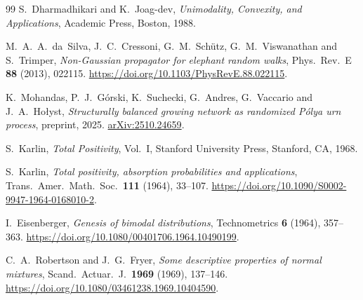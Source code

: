 \begin{thebibliography}{99}
S.~Dharmadhikari and K.~Joag-dev, \emph{Unimodality, Convexity, and
Applications}, Academic Press, Boston, 1988.

M.~A.~A.~da~Silva, J.~C.~Cressoni, G.~M.~Sch\"utz, G.~M.~Viswanathan and
S.~Trimper, \emph{Non-Gaussian propagator for elephant random walks},
Phys.\ Rev.\ E \textbf{88} (2013), 022115.
\url{https://doi.org/10.1103/PhysRevE.88.022115}.

K.~Mohandas, P.~J.~G\'orski, K.~Suchecki, G.~Andres, G.~Vaccario and J.~A.~Ho{\l}yst,
\emph{Structurally balanced growing network as randomized P\'olya urn process},
preprint, 2025.
\href{https://arxiv.org/abs/2510.24659}{arXiv:2510.24659}.

S.~Karlin, \emph{Total Positivity}, Vol.~I, Stanford University Press,
Stanford, CA, 1968.

S.~Karlin, \emph{Total positivity, absorption probabilities and applications},
Trans.\ Amer.\ Math.\ Soc.\ \textbf{111} (1964), 33--107.
\url{https://doi.org/10.1090/S0002-9947-1964-0168010-2}.

I.~Eisenberger, \emph{Genesis of bimodal distributions},
Technometrics \textbf{6} (1964), 357--363.
\url{https://doi.org/10.1080/00401706.1964.10490199}.

C.~A.~Robertson and J.~G.~Fryer, \emph{Some descriptive properties of
normal mixtures}, Scand.\ Actuar.\ J.\ \textbf{1969} (1969), 137--146.
\url{https://doi.org/10.1080/03461238.1969.10404590}.
\end{thebibliography}
